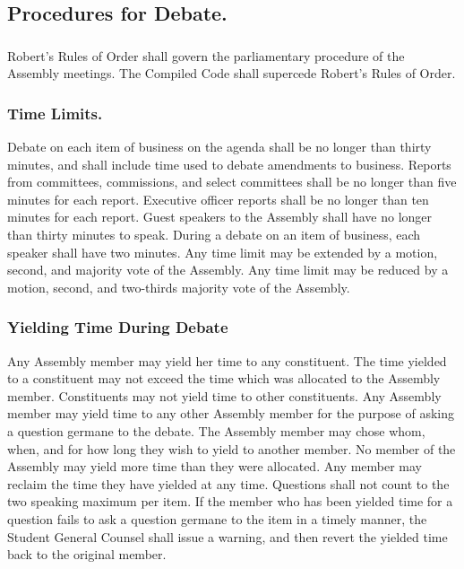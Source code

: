 \subsection{Procedures for Debate.}

\subsubsection{}
Robert’s Rules of Order shall govern the parliamentary procedure of the Assembly meetings.  The Compiled Code shall supercede Robert’s Rules of Order.

\subsubsection{Time Limits.}
\subsubsubsection{}
Debate on each item of business on the agenda shall be no longer than  thirty minutes, and shall include time used to debate amendments to business.
\subsubsubsection{}
Reports from committees, commissions, and select committees shall be no longer than five minutes for each report.
\subsubsubsection{}
Executive officer reports shall be no longer than ten minutes for each report.
\subsubsubsection{}
Guest speakers to the Assembly shall have no longer than thirty minutes to speak.
\subsubsubsection{}
During a debate on an item of business, each speaker shall have two minutes.
\subsubsubsection{}
Any time limit may be extended by a motion, second, and majority vote of the Assembly.  Any time limit may be reduced by a motion, second, and two-thirds majority vote of the Assembly.

\subsubsection{Yielding Time During Debate}
\subsubsubsection{}
Any Assembly member may yield her time to any constituent.  The time yielded to a constituent may not exceed the time which was allocated to the Assembly member.  Constituents may not yield time to other constituents.
\subsubsubsection{}
Any Assembly member may yield time to any other Assembly member for the purpose of asking a question germane to the debate.  The Assembly member may chose whom, when, and for how long they wish to yield to another member.  No member of the Assembly may yield more time than they were allocated.  Any member may reclaim the time they have yielded at any time.  Questions shall not count to the two speaking maximum per item.  If the member who has been yielded time for a question fails to ask a question germane to the item in a timely manner, the Student General Counsel shall issue a warning, and then revert the yielded time back to the original member.

